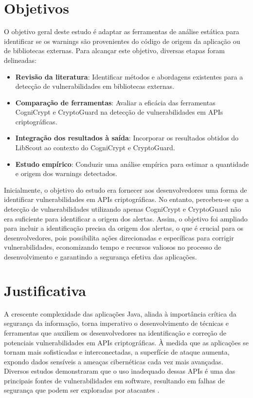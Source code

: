 \section{Objetivos}

O objetivo geral deste estudo é adaptar as ferramentas de análise estática para identificar se os warnings são provenientes do código de origem da aplicação ou de bibliotecas externas. Para alcançar este objetivo, diversas etapas foram delineadas:

\begin{itemize}
    \item \textbf{Revisão da literatura}: Identificar métodos e abordagens existentes para a detecção de vulnerabilidades em bibliotecas externas.
    \item \textbf{Comparação de ferramentas}: Avaliar a eficácia das ferramentas CogniCrypt e CryptoGuard na detecção de vulnerabilidades em APIs criptográficas.
    \item \textbf{Integração dos resultados à saída}: Incorporar os resultados obtidos do LibScout ao contexto do CogniCrypt e CryptoGuard.
    \item \textbf{Estudo empírico}: Conduzir uma análise empírica para estimar a quantidade e origem dos warnings detectados.
\end{itemize}

Inicialmente, o objetivo do estudo era fornecer aos desenvolvedores uma forma de identificar vulnerabilidades em APIs criptográficas. No entanto, percebeu-se que a detecção de vulnerabilidades utilizando apenas CogniCrypt e CryptoGuard não era suficiente para identificar a origem dos alertas. Assim, o objetivo foi ampliado para incluir a identificação precisa da origem dos alertas, o que é crucial para os desenvolvedores, pois possibilita ações direcionadas e específicas para corrigir vulnerabilidades, economizando tempo e recursos valiosos no processo de desenvolvimento e garantindo a segurança efetiva das aplicações.

\section{Justificativa}

A crescente complexidade das aplicações Java, aliada à importância crítica da segurança da informação, torna imperativo o desenvolvimento de técnicas e ferramentas que auxiliem os desenvolvedores na identificação e correção de potenciais vulnerabilidades em APIs criptográficas. À medida que as aplicações se tornam mais sofisticadas e interconectadas, a superfície de ataque aumenta, expondo dados sensíveis a ameaças cibernéticas cada vez mais avançadas. Diversos estudos demonstraram que o uso inadequado dessas APIs é uma das principais fontes de vulnerabilidades em software, resultando em falhas de segurança que podem ser exploradas por atacantes \cite{api_misuses_zhang, nadi_icse_2016}.

